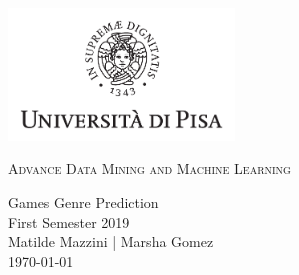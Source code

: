 \documentclass{book}
\author{Matilde Mazzini | Marsha Gomez Gomez}
\begin{document}
\begin{titlepage}
    \centering
    \includegraphics[width=6cm]{unipi}
    \vfill
    \vspace{1.5cm}
    {\huge\textsc{Advance Data Mining and Machine Learning}\par}
    {\Large
        Games Genre Prediction\\
        First Semester 2019\\
        \vskip2cm
        Matilde Mazzini | Marsha Gomez\\
        \vskip2cm
        \today
    }    
    \vfill
    \vfill
\end{titlepage}
    \tableofcontents
\end{document}
